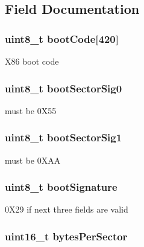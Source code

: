 \subsection{Field Documentation}
\hypertarget{structfat32__boot_a5d683c906867f4e0122d2ce3462de292}{
\subsubsection[{boot\-Code}]{\setlength{\rightskip}{0pt plus 5cm}uint8\-\_\-t boot\-Code\mbox{[}420\mbox{]}}}\label{structfat32__boot_a5d683c906867f4e0122d2ce3462de292}
X86 boot code \hypertarget{structfat32__boot_abdaf2cc75b74800944ede557442ca5bd}{
\subsubsection[{boot\-Sector\-Sig0}]{\setlength{\rightskip}{0pt plus 5cm}uint8\-\_\-t boot\-Sector\-Sig0}}\label{structfat32__boot_abdaf2cc75b74800944ede557442ca5bd}
must be 0\-X55 \hypertarget{structfat32__boot_a44983e94ecddbdcb7ab691e493a13d94}{
\subsubsection[{boot\-Sector\-Sig1}]{\setlength{\rightskip}{0pt plus 5cm}uint8\-\_\-t boot\-Sector\-Sig1}}\label{structfat32__boot_a44983e94ecddbdcb7ab691e493a13d94}
must be 0\-X\-A\-A \hypertarget{structfat32__boot_acc4a4e4c22b630d12c1b2c2b8c7eb366}{
\subsubsection[{boot\-Signature}]{\setlength{\rightskip}{0pt plus 5cm}uint8\-\_\-t boot\-Signature}}\label{structfat32__boot_acc4a4e4c22b630d12c1b2c2b8c7eb366}
0\-X29 if next three fields are valid \hypertarget{structfat32__boot_adb2ddeae74baf681103d21d724814a63}{
\subsubsection[{bytes\-Per\-Sector}]{\setlength{\rightskip}{0pt plus 5cm}uint16\-\_\-t bytes\-Per\-Sector}}\label{structfat32__boot_adb2ddeae74baf681103d21d724814a63}

